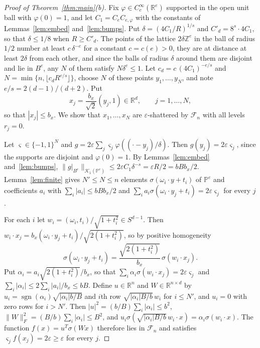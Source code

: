 \documentclass[11pt]{amsart}
\theoremstyle{definition}
\theoremstyle{remark}
\numberwithin{equation}{section}
\newcommand{\RR}{\mathbb{R}}
\newcommand{\cF}{\mathcal{F}}
\newcommand{\cP}{\mathbb{P}}
\newcommand{\sgn}{\operatorname{sgn}}
\begin{document}
\begin{proof}[Proof of Theorem~\ref{thm:main}(b)]
Fix $\varphi\in C_c^\infty(\RR^e)$ supported in the open unit ball with $\varphi(0)=1$, and let $C_1=C_eC_{e,\varphi}$ with the constants of Lemmas~\ref{lem:embed} and~\ref{lem:bumps}. Put $\delta=(4C_1/R)^{1/s}$ and $C'_d=8^s\cdot4C_1$, so that $\delta\le1/8$ when $R\ge C'_d$. The points of the lattice $2\delta\mathbb Z^e$ in the ball of radius $1/2$ number at least $c\,\delta^{-e}$ for a constant $c=c(e)>0$, they are at distance at least $2\delta$ from each other, and since the balls of radius $\delta$ around them are disjoint and lie in $B^e$, any $N$ of them satisfy $N\delta^e\le1$. Let $c_d=c\,(4C_1)^{-e/s}$ and $N=\min\{n,\lfloor c_dR^{e/s}\rfloor\}$, choose $N$ of these points $y_1,\dots,y_N$, and note $e/s=2(d-1)/(d+2)$. Put
\[
x_j=\frac{b_x}{\sqrt2}(y_j,1)\in\RR^d,\qquad j=1,\dots,N,
\]
so that $|x_j|\le b_x$. We show that $x_1,\dots,x_N$ are $\varepsilon$-shattered by $\cF_n$ with all levels $r_j=0$.

Let $\varsigma\in\{-1,1\}^N$ and $g=2\varepsilon\sum_j\varsigma_j\varphi((\cdot-y_j)/\delta)$. Then $g(y_j)=2\varepsilon\varsigma_j$, since the supports are disjoint and $\varphi(0)=1$. By Lemmas~\ref{lem:embed} and~\ref{lem:bumps}, $\|g|_{B^e}\|_{\mathcal K_1(\cP^e)}\le2\varepsilon C_1\delta^{-s}=\varepsilon R/2=bBb_x/2$. Lemma~\ref{lem:finite} gives $N'\le N\le n$ elements $\sigma(\omega_i\cdot y+t_i)$ of $\cP^e$ and coefficients $a_i$ with $\sum_i|a_i|\le bBb_x/2$ and $\sum_ia_i\sigma(\omega_i\cdot y_j+t_i)=2\varepsilon\varsigma_j$ for every $j$.

For each $i$ let $w_i=(\omega_i,t_i)/\sqrt{1+t_i^2}\in S^{d-1}$. Then $w_i\cdot x_j=b_x(\omega_i\cdot y_j+t_i)/\sqrt{2(1+t_i^2)}$, so by positive homogeneity
\[
\sigma(\omega_i\cdot y_j+t_i)=\frac{\sqrt{2(1+t_i^2)}}{b_x}\,\sigma(w_i\cdot x_j).
\]
Put $\alpha_i=a_i\sqrt{2(1+t_i^2)}/b_x$, so that $\sum_i\alpha_i\sigma(w_i\cdot x_j)=2\varepsilon\varsigma_j$ and $\sum_i|\alpha_i|\le2\sum_i|a_i|/b_x\le bB$. Define $u\in\RR^n$ and $W\in\RR^{n\times d}$ by $u_i=\sgn(\alpha_i)\sqrt{|\alpha_i|b/B}$ and $i$th row $\sqrt{|\alpha_i|B/b}\,w_i$ for $i\le N'$, and $u_i=0$ with zero rows for $i>N'$. Then $|u|^2=(b/B)\sum_i|\alpha_i|\le b^2$, $\|W\|_F^2=(B/b)\sum_i|\alpha_i|\le B^2$, and $u_i\sigma(\sqrt{|\alpha_i|B/b}\,w_i\cdot x)=\alpha_i\sigma(w_i\cdot x)$. The function $f(x)=u^{T}\sigma(Wx)$ therefore lies in $\cF_n$ and satisfies $\varsigma_jf(x_j)=2\varepsilon\ge\varepsilon$ for every $j$.
\end{proof}
\end{document}

